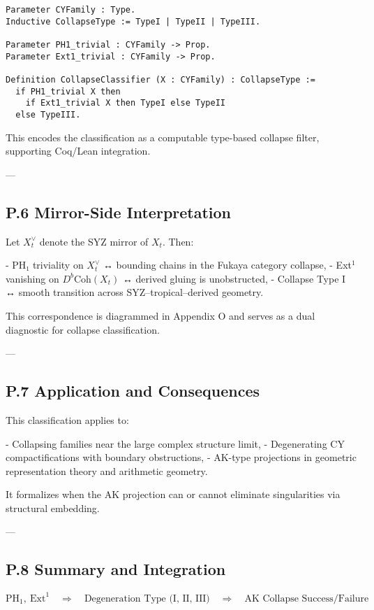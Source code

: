 \documentclass[11pt]{article}
\begin{document}
\begin{axiom}
\begin{axiom}
{{\begin{lstlisting}[language=Coq]
Parameter CYFamily : Type.
Inductive CollapseType := TypeI | TypeII | TypeIII.

Parameter PH1_trivial : CYFamily -> Prop.
Parameter Ext1_trivial : CYFamily -> Prop.

Definition CollapseClassifier (X : CYFamily) : CollapseType :=
  if PH1_trivial X then
    if Ext1_trivial X then TypeI else TypeII
  else TypeIII.
\end{lstlisting}

This encodes the classification as a computable type-based collapse filter, supporting Coq/Lean integration.

---

\subsection*{P.6 Mirror-Side Interpretation}

Let \( X^\vee_t \) denote the SYZ mirror of \( X_t \). Then:

- PH₁ triviality on \( X_t^\vee \) ↔ bounding chains in the Fukaya category collapse,
- Ext$^1$ vanishing on \( D^b\mathrm{Coh}(X_t) \) ↔ derived gluing is unobstructed,
- Collapse Type I ↔ smooth transition across SYZ–tropical–derived geometry.

This correspondence is diagrammed in Appendix O and serves as a dual diagnostic for collapse classification.

---

\subsection*{P.7 Application and Consequences}

This classification applies to:

- Collapsing families near the large complex structure limit,
- Degenerating CY compactifications with boundary obstructions,
- AK-type projections in geometric representation theory and arithmetic geometry.

It formalizes when the AK projection can or cannot eliminate singularities via structural embedding.

---

\subsection*{P.8 Summary and Integration}

\[
\boxed{
\mathrm{PH}_1,\ \mathrm{Ext}^1 \quad \Rightarrow \quad \text{Degeneration Type (I, II, III)} \quad \Rightarrow \quad \text{AK Collapse Success/Failure}
}
\]

}}
\end{axiom}
\end{axiom}
\end{document}
